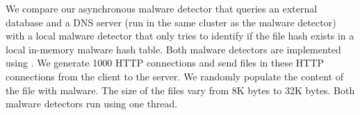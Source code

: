 \begin{table}[!h]
\centering
\caption{Performance of Malware Detectors}
\label{table:malware-detector-stat}
\vspace{-5mm}
\end{table}

We compare our asynchronous malware detector that queries an external database and a DNS server (run in the same cluster as the malware detector) with a local malware detector that only tries to identify if the file hash exists in a local in-memory malware hash table. Both malware detectors are implemented using \netstar.
We generate 1000 HTTP connections and send files in these HTTP connections from the client to the server. We randomly populate the content of the file with malware. The size of the files vary from 8K bytes to 32K bytes. Both malware detectors run using one thread.%


